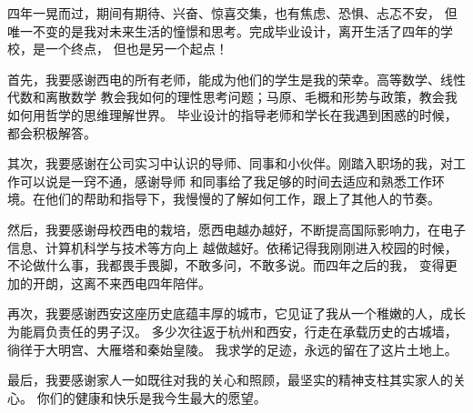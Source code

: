 \begin{thanksfor}
    四年一晃而过，期间有期待、兴奋、惊喜交集，也有焦虑、恐惧、忐忑不安，
    但唯一不变的是我对未来生活的憧憬和思考。完成毕业设计，离开生活了四年的学校，是一个终点，
    但也是另一个起点！

    首先，我要感谢西电的所有老师，能成为他们的学生是我的荣幸。高等数学、线性代数和离散数学
    教会我如何的理性思考问题；马原、毛概和形势与政策，教会我如何用哲学的思维理解世界。
    毕业设计的指导老师和学长在我遇到困惑的时候，都会积极解答。

    其次，我要感谢在公司实习中认识的导师、同事和小伙伴。刚踏入职场的我，对工作可以说是一窍不通，感谢导师
    和同事给了我足够的时间去适应和熟悉工作环境。在他们的帮助和指导下，我慢慢的了解如何工作，跟上了其他人的节奏。

    然后，我要感谢母校西电的栽培，愿西电越办越好，不断提高国际影响力，在电子信息、计算机科学与技术等方向上
    越做越好。依稀记得我刚刚进入校园的时候，不论做什么事，我都畏手畏脚，不敢多问，不敢多说。而四年之后的我，
    变得更加的开朗，这离不来西电四年陪伴。

    再次，我要感谢西安这座历史底蕴丰厚的城市，它见证了我从一个稚嫩的人，成长为能肩负责任的男子汉。
    多少次往返于杭州和西安，行走在承载历史的古城墙，徜徉于大明宫、大雁塔和秦始皇陵。
    我求学的足迹，永远的留在了这片土地上。

    最后，我要感谢家人一如既往对我的关心和照顾，最坚实的精神支柱其实家人的关心。
    你们的健康和快乐是我今生最大的愿望。

\end{thanksfor}